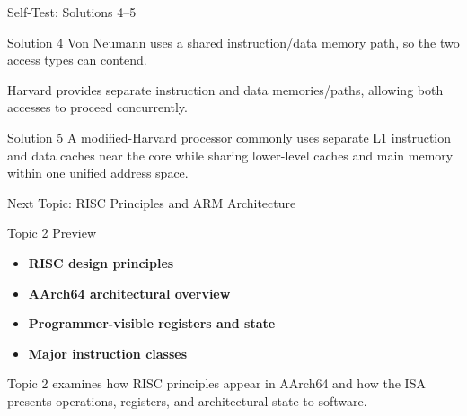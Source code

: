 \documentclass[aspectratio=169,11pt,t]{beamer}
\newcommand{\key}[1]{\textbf{#1}}
\begin{document}

\begin{frame}{Self-Test: Solutions 4--5}

\begin{block}{Solution 4}
Von Neumann uses
a shared instruction/data memory path,
so the two access types can contend.

Harvard provides
separate instruction and data memories/paths,
allowing both accesses
to proceed concurrently.
\end{block}

\vspace{0.3cm}

\begin{block}{Solution 5}
A modified-Harvard processor commonly uses
separate L1 instruction
and data caches near the core
while sharing lower-level caches
and main memory
within one unified address space.
\end{block}

\end{frame}




\begin{frame}{Next Topic: RISC Principles and ARM Architecture}

\begin{block}{Topic 2 Preview}

\begin{itemize}
  \item \key{RISC design principles}
  \item \key{AArch64 architectural overview}
  \item \key{Programmer-visible registers and state}
  \item \key{Major instruction classes}
\end{itemize}

\end{block}

\vspace{0.3cm}

Topic 2 examines how RISC principles appear in AArch64
and how the ISA presents operations, registers,
and architectural state to software.

\end{frame}
\end{document}

